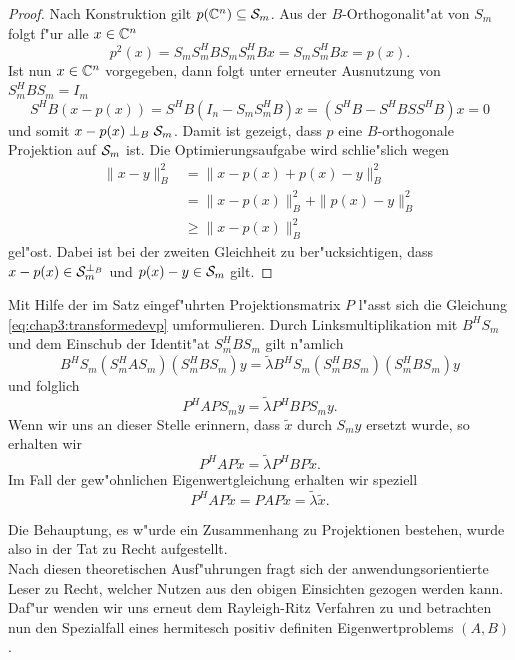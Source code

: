 \newpage

\begin{proof}
Nach Konstruktion gilt $p(\Cn)\subseteq \S_m$. Aus der $B$-Orthogonalit"at von $S_m$ folgt f"ur alle $x\in\Cn$
\[
p^2 (x) = S_m S_m^H B S_m S_m^H B x= S_m S_m^H Bx = p(x).
\]
Ist nun $x\in\Cn$ vorgegeben, dann folgt unter erneuter Ausnutzung von $S_m^H BS_m = I_m$
\[
S^H B (x-p(x)) = S^H B (I_n - S_m S_m^H B)x
=(S^H B - S^H B S S^H B)x = 0
\]
und somit $x-p(x) \perp_B \S_m$. Damit ist gezeigt, dass $p$ eine $B$-orthogonale Projektion auf $\S_m$ ist. Die Optimierungsaufgabe wird schlie"slich wegen
\begin{align*}
\|x-y\|_B^2 &= \|x-p(x) + p(x)-y\|_B^2 \\
&= \|x-p(x)\|_B^2 + \|p(x)-y\|_B^2\\
&\ge \|x-p(x)\|_B^2
\end{align*}
gel"ost. Dabei ist bei der zweiten Gleichheit zu ber"ucksichtigen, dass $x-p(x) \in \S_m^{\bot_B}$
und $p(x)-y \in \S_m$ gilt.
\end{proof}

Mit Hilfe der im Satz eingef"uhrten Projektionsmatrix $P$ l"asst sich die Gleichung
\eqref{eq:chap3:transformedevp} umformulieren. Durch Linksmultiplikation
mit $B^H S_m$ und dem Einschub der Identit"at $S_m^H B S_m$ gilt n"amlich
\[
B^H S_m (S_m^H A S_m)(S_m^H B S_m)y = \widetilde{\lambda} B^H S_m (S_m^H B S_m)(S_m^H B S_m)y
\]
und folglich
\[
P^H A P S_m y = \widetilde{\lambda} P^H B P S_m y.
\]
Wenn wir uns an dieser Stelle erinnern, dass $\widetilde{x}$ durch $S_m y$ ersetzt wurde, so
erhalten wir
\[
P^H A P \widetilde{x} = \widetilde{\lambda} P^H B P \widetilde{x}.
\]
Im Fall der gew"ohnlichen Eigenwertgleichung erhalten wir speziell
\[
P^H A P \widetilde{x} = P A P \widetilde{x} = \widetilde{\lambda} \widetilde{x}.
\]

Die Behauptung, es w"urde ein Zusammenhang zu Projektionen bestehen, wurde also in der Tat zu Recht aufgestellt.\\

Nach diesen theoretischen Ausf"uhrungen fragt sich der anwendungsorientierte Leser zu Recht, welcher Nutzen aus den obigen Einsichten gezogen werden kann.
Daf"ur wenden wir uns erneut dem Rayleigh-Ritz Verfahren zu und betrachten nun den Spezialfall eines hermitesch positiv definiten Eigenwertproblems $(A,B)$.

\newpage

